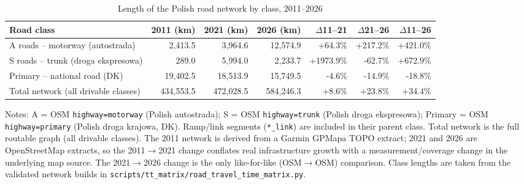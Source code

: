 \begin{table}[htbp]
\centering
\caption{Length of the Polish road network by class, 2011--2026}
\label{tab:road_network_lengths}
\begin{tabular}{lrrrrrr}
\hline\hline
Road class & 2011 (km) & 2021 (km) & 2026 (km) & $\Delta$11--21 & $\Delta$21--26 & $\Delta$11--26 \\
\hline
A roads -- motorway (autostrada) & 2,413.5 & 3,964.6 & 12,574.9 & +64.3\% & +217.2\% & +421.0\% \\
S roads -- trunk (droga ekspresowa) & 289.0 & 5,994.0 & 2,233.7 & +1973.9\% & -62.7\% & +672.9\% \\
Primary -- national road (DK) & 19,402.5 & 18,513.9 & 15,749.5 & -4.6\% & -14.9\% & -18.8\% \\
Total network (all drivable classes) & 434,553.5 & 472,028.5 & 584,246.3 & +8.6\% & +23.8\% & +34.4\% \\
\hline\hline
\end{tabular}
\begin{minipage}{0.95\linewidth}
\vspace{4pt}
{\footnotesize Notes: A = OSM \texttt{highway=motorway} (Polish autostrada); S = OSM \texttt{highway=trunk} (Polish droga ekspresowa); Primary = OSM \texttt{highway=primary} (Polish droga krajowa, DK). Ramp/link segments (\texttt{*\_link}) are included in their parent class. Total network is the full routable graph (all drivable classes). The 2011 network is derived from a Garmin GPMapa TOPO extract; 2021 and 2026 are OpenStreetMap extracts, so the 2011$\to$2021 change conflates real infrastructure growth with a measurement/coverage change in the underlying map source. The 2021$\to$2026 change is the only like-for-like (OSM$\to$OSM) comparison. Class lengths are taken from the validated network builds in \texttt{scripts/tt\_matrix/road\_travel\_time\_matrix.py}.}
\end{minipage}
\end{table}
